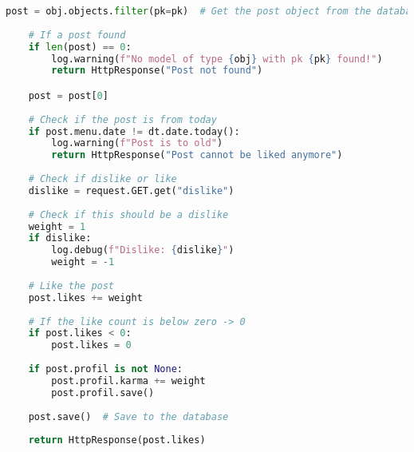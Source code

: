 \begin{lstlisting}[language=Python]
    post = obj.objects.filter(pk=pk)  # Get the post object from the database
    
    # If a post found
    if len(post) == 0:
        log.warning(f"No model of type {obj} with pk {pk} found!")
        return HttpResponse("Post not found")

    post = post[0]
    
    # Check if the post is from today
    if post.menu.date != dt.date.today():
        log.warning(f"Post is to old")
        return HttpResponse("Post cannot be liked anymore")
    
    # Check if dislike or like
    dislike = request.GET.get("dislike")
    
    # Check if this should be a dislike
    weight = 1
    if dislike:
        log.debug(f"Dislike: {dislike}")
        weight = -1
    
    # Like the post
    post.likes += weight
    
    # If the like count is below zero -> 0
    if post.likes < 0:
        post.likes = 0
        
    if post.profil is not None:
        post.profil.karma += weight
        post.profil.save()
    
    post.save()  # Save to the database
    
    return HttpResponse(post.likes)

\end{lstlisting}